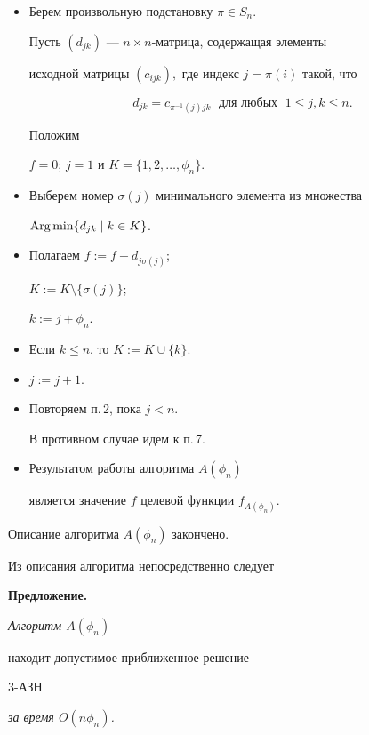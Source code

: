 \begin{itemize}


\item[1.] Берем произвольную подстановку $\pi \in S_n$.


Пусть $(d_{jk})$ --- $n \times n$-матрица, содержащая элементы


исходной матрицы $ (c_{ijk}), $ где индекс $ j = \pi(i) $ такой, что 


$$


d_{jk} = c_{\pi^{-1}(j)jk} \; \text{ для любых } \; 1 \le j, k \le n.


$$ 


Положим


$f=0$; $j = 1$ и $K = \{1, 2, \dotsc, \phi_n\}$.


\item[2.] Выберем номер $\sigma (j)$ минимального элемента из множества


$\operatorname{Arg\,min} \{d_{jk} \mid k \in K\}$.


\item[3.] Полагаем $f := f + d_{j\sigma(j)}$;


$K := K \setminus \{\sigma(j)\}$; 


$k :=j + \phi_n$.


\item[4.] Если $k \le n$, то $K := K \cup \{k\}$.


\item[5.] $j := j + 1$.


\item[6.] Повторяем п.\,2, пока $j < n$.


В противном случае идем к п.\,7.


\item[7.] Результатом работы алгоритма $A(\phi_n)$ 


является значение $f$ целевой функции $f_{ A(\phi_n)}$.


\end{itemize}


Описание алгоритма $ A(\phi_n) $ закончено.


Из описания алгоритма непосредственно следует


\medskip





{\bf Предложение.} {\it Алгоритм $A(\phi_n)$ 


находит допустимое приближенное решение} 3-АЗН


{\it за время $O(n \phi_n)$.}





